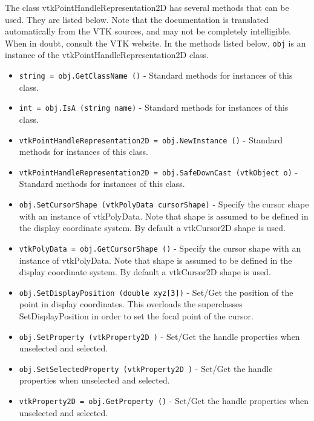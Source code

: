 The class vtkPointHandleRepresentation2D has several methods that can be used.
  They are listed below.
Note that the documentation is translated automatically from the VTK sources,
and may not be completely intelligible.  When in doubt, consult the VTK website.
In the methods listed below, \verb|obj| is an instance of the vtkPointHandleRepresentation2D class.
\begin{itemize}
\item  \verb|string = obj.GetClassName ()| -  Standard methods for instances of this class.

\item  \verb|int = obj.IsA (string name)| -  Standard methods for instances of this class.

\item  \verb|vtkPointHandleRepresentation2D = obj.NewInstance ()| -  Standard methods for instances of this class.

\item  \verb|vtkPointHandleRepresentation2D = obj.SafeDownCast (vtkObject o)| -  Standard methods for instances of this class.

\item  \verb|obj.SetCursorShape (vtkPolyData cursorShape)| -  Specify the cursor shape with an instance of vtkPolyData. Note that
 shape is assumed to be defined in the display coordinate system. By
 default a vtkCursor2D shape is used.

\item  \verb|vtkPolyData = obj.GetCursorShape ()| -  Specify the cursor shape with an instance of vtkPolyData. Note that
 shape is assumed to be defined in the display coordinate system. By
 default a vtkCursor2D shape is used.

\item  \verb|obj.SetDisplayPosition (double xyz[3])| -  Set/Get the position of the point in display coordinates.  This overloads
 the superclasses SetDisplayPosition in order to set the focal point
 of the cursor.

\item  \verb|obj.SetProperty (vtkProperty2D )| -  Set/Get the handle properties when unselected and selected.

\item  \verb|obj.SetSelectedProperty (vtkProperty2D )| -  Set/Get the handle properties when unselected and selected.

\item  \verb|vtkProperty2D = obj.GetProperty ()| -  Set/Get the handle properties when unselected and selected.


\end{itemize}
